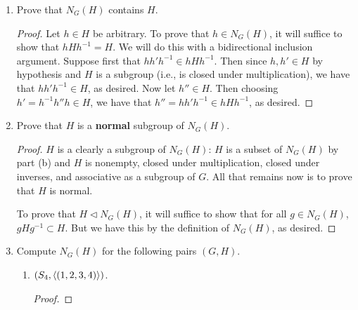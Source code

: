 \documentclass[../psets.tex]{subfiles}
\begin{document}
\begin{enumerate}
\begin{enumerate}
\begin{proof}
            Now suppose that $H$ is normal. Then $ghg^{-1}\in H$ for all $g\in G$ and $h\in H$. Additionally, if $h'\in H$, then $h=g^{-1}h'g\in H$ by hypothesis, so $h'=ghg^{-1}\in gHg^{-1}$. It follows by the definition of set equality that $gHg^{-1}=H$ for all $g\in G$. But by the definition of $N_G(H)$, this means that $N_G(H)=G$, as desired.
        \end{proof}
        \item Prove that $N_G(H)$ contains $H$.
        \begin{proof}


            Let $h\in H$ be arbitrary. To prove that $h\in N_G(H)$, it will suffice to show that $hHh^{-1}=H$. We will do this with a bidirectional inclusion argument. Suppose first that $hh'h^{-1}\in hHh^{-1}$. Then since $h,h'\in H$ by hypothesis and $H$ is a subgroup (i.e., is closed under multiplication), we have that $hh'h^{-1}\in H$, as desired. Now let $h''\in H$. Then choosing $h'=h^{-1}h''h\in H$, we have that $h''=hh'h^{-1}\in hHh^{-1}$, as desired.
        \end{proof}
        \item Prove that $H$ is a \textbf{normal} subgroup of $N_G(H)$.
        \begin{proof}
            $H$ is a clearly a subgroup of $N_G(H)$: $H$ is a subset of $N_G(H)$ by part (b) and $H$ is nonempty, closed under multiplication, closed under inverses, and associative as a subgroup of $G$. All that remains now is to prove that $H$ is normal.\par
            To prove that $H\triangleleft N_G(H)$, it will suffice to show that for all $g\in N_G(H)$, $gHg^{-1}\subset H$. But we have this by the definition of $N_G(H)$, as desired.
        \end{proof}
        \pagebreak
        \item Compute $N_G(H)$ for the following pairs $(G,H)$.
        \begin{enumerate}
            \item $(S_4,\left\langle{(1,2,3,4)}\right\rangle)$.
            \begin{proof}


\end{proof}
\end{enumerate}
\end{enumerate}
\end{enumerate}
\end{document}
